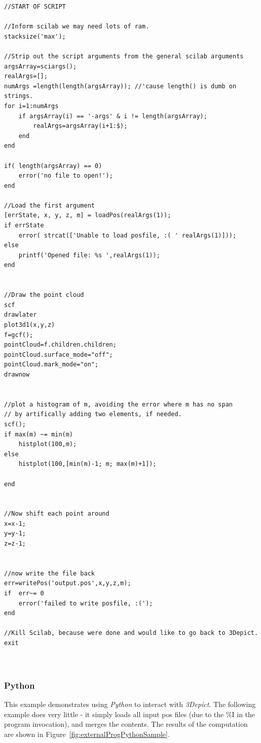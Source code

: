 \documentclass[10pt]{article}
\begin{document}
\begin{verbatim}
//START OF SCRIPT

//Inform scilab we may need lots of ram.
stacksize('max'); 

//Strip out the script arguments from the general scilab arguments
argsArray=sciargs();
realArgs=[];
numArgs =length(length(argsArray)); //'cause length() is dumb on strings.
for i=1:numArgs
    if argsArray(i) == '-args' & i != length(argsArray);
        realArgs=argsArray(i+1:$);
    end
end

if( length(argsArray) == 0)
    error('no file to open!');
end

//Load the first argument
[errState, x, y, z, m] = loadPos(realArgs(1));
if errState
    error( strcat(['Unable to load posfile, :( ' realArgs(1)]));
else
    printf('Opened file: %s ',realArgs(1));
end


//Draw the point cloud
scf
drawlater
plot3d1(x,y,z)
f=gcf();
pointCloud=f.children.children;
pointCloud.surface_mode="off";
pointCloud.mark_mode="on";
drawnow


//plot a histogram of m, avoiding the error where m has no span
// by artifically adding two elements, if needed.
scf();
if max(m) ~= min(m)
    histplot(100,m);
else
    histplot(100,[min(m)-1; m; max(m)+1]);
    
end


//Now shift each point around 
x=x-1;
y=y-1;
z=z-1;


//now write the file back
err=writePos('output.pos',x,y,z,m);
if  err~= 0
    error('failed to write posfile, :(');
end

//Kill Scilab, because were done and would like to go back to 3Depict.
exit



\end{verbatim}




\subsubsection{Python}
This example demonstrates using \emph{Python} to interact with \emph{3Depict}. The following example does very little - it simply loads all input pos files (due to the \%I in the program invocation), and merges the contents. The results of the computation are shown in Figure~\ref{fig:externalProgPythonSample}.
\end{document}
